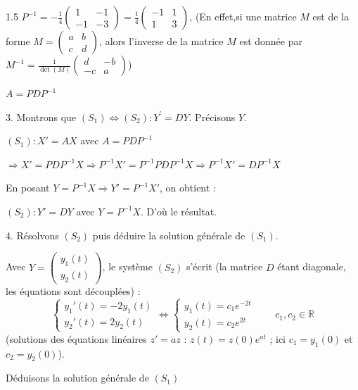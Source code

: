 \documentclass[12pt]{article}
\begin{document}
\begin{spacing}{1.5}
$ P ^{-1}=-\frac{1}{4}\begin{pmatrix}
1 & -1\\
-1 & -3
\end{pmatrix}=\frac{1}{4}\begin{pmatrix}
-1 & 1\\
1 & 3
\end{pmatrix}$, (En effet,si une matrice $M$ est de la forme $M=\begin{pmatrix}
a & b\\
c & d
\end{pmatrix}$, alors l'inverse de la matrice $M$ est donnée par $M^{-1}=\frac{1}{\det(M)}\begin{pmatrix}
d & -b\\
-c & a
\end{pmatrix}$)



$A=PDP^{-1}$

3. Montrons que $(S_1)\Longleftrightarrow(S_2):Y^{\prime} = DY$. Précisons $Y$.

$(S_1): X'=AX$ avec $A=PDP^{-1}$

$\Rightarrow X'=PDP^{-1}X\Rightarrow P^{-1}X'=P^{-1}PDP^{-1}X\Rightarrow P^{-1}X'=DP^{-1}X$

En posant $Y=P^{-1}X\Rightarrow Y'=P^{-1}X'$, on obtient :

$(S_2):Y'=DY$ avec $Y=P^{-1}X$. D'où le résultat.

4. Résolvons $(S_2)$ puis déduire la solution générale de $(S_1)$.

Avec $Y=\begin{pmatrix}y_1(t)\\y_2(t)\end{pmatrix}$, le système $(S_2)$ s'écrit (la matrice $D$ étant diagonale, les équations sont découplées) :
\[
\begin{cases}y_1'(t)=-2y_1(t)\\y_2'(t)=2y_2(t)\end{cases}\iff\begin{cases}y_1(t)=c_1e^{-2t}\\y_2(t)=c_2e^{2t}\end{cases}\qquad c_1,c_2\in\mathbb{R}
\]
(solutions des équations linéaires $z'=az$ : $z(t)=z(0)e^{at}$ ; ici $c_1=y_1(0)$ et $c_2=y_2(0)$).

\medskip
 Déduisons la solution générale de $(S_1)$
 

\end{spacing}
\end{document}

